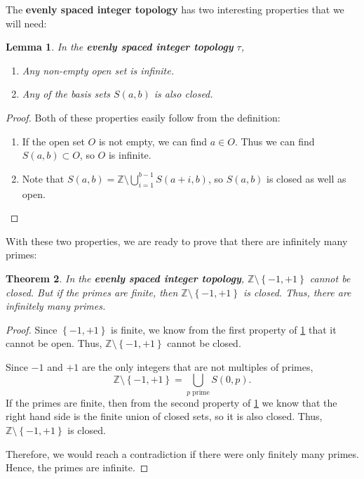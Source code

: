 \documentclass[a4paper]{article}
\newtheorem{theorem}{Theorem}[section]
\newtheorem{lemma}[theorem]{Lemma}
\theoremstyle{definition}
\theoremstyle{remark}
\begin{document}
The \textbf{evenly spaced integer topology} has two interesting properties that we will need:
\begin{lemma}
  In the \textbf{evenly spaced integer topology} $\tau$,
  \begin{enumerate}
    \item Any non-empty open set is infinite.
    \item Any of the basis sets $S(a,b)$ is also closed.
  \end{enumerate}
  \label{lem:2prop}
\end{lemma}
\begin{proof}
  Both of these properties easily follow from the definition:
  \begin{enumerate}
    \item If the open set $O$ is not empty, we can find $a\in O$. Thus we can find $S(a,b)\subset O$, so $O$ is infinite.
    \item Note that $\displaystyle S(a,b)=\mathbb{Z}\setminus \bigcup\limits_{i=1}^{b-1}S(a+i,b)$, so $S(a,b)$ is closed as well as open.
  \end{enumerate}
\end{proof}
With these two properties, we are ready to prove that there are infinitely many primes:
\begin{theorem}
  In the \textbf{evenly spaced integer topology}, $\mathbb{Z}\setminus\left\{ -1,+1 \right\}$ cannot be closed. But if the primes are finite, then $\mathbb{Z}\setminus\left\{ -1,+1 \right\}$ is closed. Thus, there are infinitely many primes.
  \label{thm:topPrimes}
\end{theorem}
\begin{proof}
  Since $\left\{ -1,+1 \right\}$ is finite, we know from the first property of \cref{lem:2prop} that it cannot be open. Thus, $\mathbb{Z}\setminus\left\{ -1,+1 \right\}$ cannot be closed.

  Since $-1$ and $+1$ are the only integers that are not multiples of primes,
  \[
  \mathbb{Z}\setminus\left\{ -1,+1 \right\}=\bigcup\limits_{p\text{ prime}}S(0,p)
  .
  \]
  If the primes are finite, then from the second property of \cref{lem:2prop} we know that the right hand side is the finite union of closed sets, so it is also closed. Thus, $\mathbb{Z}\setminus\left\{ -1,+1 \right\}$ is closed.

  Therefore, we would reach a contradiction if there were only finitely many primes. Hence, the primes are infinite.
\end{proof}
\end{document}
